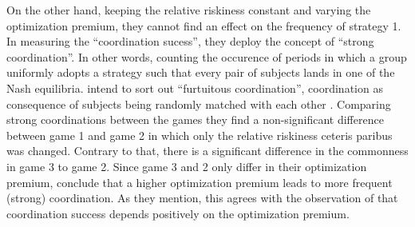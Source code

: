 \documentclass[11pt]{article}
\begin{document}
On the other hand, keeping the relative riskiness constant and varying the
optimization premium, they cannot find an effect on the frequency of 
strategy 1. 
In measuring the ``coordination sucess'', they deploy the concept of ``strong
coordination''. 
In other words, counting the occurence of periods in which a group
uniformly adopts a strategy such that every pair of subjects lands in one
of the Nash equilibria. \textcite{dubois_optimization_2012} intend to sort 
out ``furtuitous coordination'', coordination as consequence of subjects being
randomly matched with each other \parencite[373]{dubois_optimization_2012}.
Comparing strong coordinations between the games they find a non-significant 
difference between game 1 and game 2 in which only the relative riskiness 
ceteris paribus was changed. Contrary to that, there is a significant 
difference in the commonness in game 3 to game 2.
Since game 3 and 2 only differ in their optimization premium, 
\textcite{dubois_optimization_2012} conclude that a higher optimization
premium leads to more frequent (strong) coordination. 
As they mention, this agrees with the observation of 
\textcite{battalio_optimization_2001} that coordination success depends 
positively on the optimization premium. 
\end{document}
